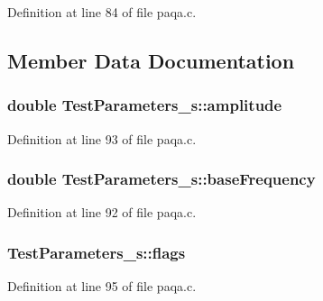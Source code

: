 Definition at line 84 of file paqa.\+c.



\subsection{Member Data Documentation}
\subsubsection[{\texorpdfstring{amplitude}{amplitude}}]{\setlength{\rightskip}{0pt plus 5cm}double Test\+Parameters\+\_\+s\+::amplitude}\hypertarget{struct_test_parameters__s_acceb914d6148384e4fb344157bc4c057}{}\label{struct_test_parameters__s_acceb914d6148384e4fb344157bc4c057}


Definition at line 93 of file paqa.\+c.

\subsubsection[{\texorpdfstring{base\+Frequency}{baseFrequency}}]{\setlength{\rightskip}{0pt plus 5cm}double Test\+Parameters\+\_\+s\+::base\+Frequency}\hypertarget{struct_test_parameters__s_ae25f9b5ff6229a0af9fc432607aba2a7}{}\label{struct_test_parameters__s_ae25f9b5ff6229a0af9fc432607aba2a7}


Definition at line 92 of file paqa.\+c.

\subsubsection[{\texorpdfstring{flags}{flags}}]{ Test\+Parameters\+\_\+s\+::flags}\hypertarget{struct_test_parameters__s_ac1428cda918879ae303f9f8a1182e39a}{}\label{struct_test_parameters__s_ac1428cda918879ae303f9f8a1182e39a}


Definition at line 95 of file paqa.\+c.

